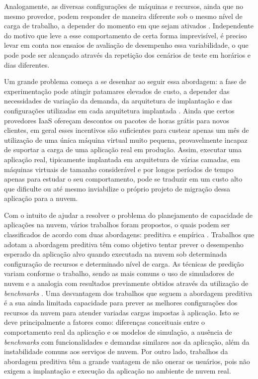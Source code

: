 Analogamente, as diversas configurações de máquinas e recursos, ainda que no mesmo 
provedor, podem responder de maneira diferente sob o mesmo nível de carga de 
trabalho, a depender do momento em que sejam ativados \cite{cunha2011investigating, 
iosup2011performance, jayasinghe2011variations}. Independente do motivo que leve 
a esse comportamento de certa forma imprevisível, é preciso levar em conta nos 
ensaios de avaliação de desempenho essa variabilidade, o que pode pode ser alcançado 
através da repetição dos cenários de teste em horários e dias diferentes.

Um grande problema começa a se desenhar ao seguir essa abordagem: a fase de
experimentação pode atingir patamares elevados de custo, a depender das
necessidades de variação da demanda, da arquitetura de implantação e das 
configurações utilizadas em cada arquitetura implantada \cite{silva2013cloudbench}. 
Ainda que certos provedores IaaS ofereçam descontos ou pacotes de horas grátis 
para novos clientes, em geral esses incentivos são suficientes para custear apenas 
um mês de utilização de uma única máquina virtual muito pequena, provavelmente 
incapaz de suportar a carga de uma aplicação real em produção. Assim, executar 
uma aplicação real, tipicamente implantada em arquitetura de várias camadas, em 
máquinas virtuais de tamanho considerável e por longos períodos de tempo apenas 
para estudar o seu comportamento, pode se traduzir em um custo alto que dificulte ou até mesmo inviabilize 
o próprio projeto de migração dessa aplicação para a nuvem. 

Com o intuito de ajudar a resolver o problema do planejamento de capacidade de aplicações na nuvem, vários trabalhos foram propostos, o quais podem ser classificados de acordo com duas abordagens: preditiva \cite{cloudharmony,
malkowski2010cloudxplor, fittkau2012cdosim, li2011cloudprophet} e empírica 
\cite{jayasinghe2012, silva2013cloudbench, cunhacloud, scheuner2014cloud}.
Trabalhos que adotam a abordagem preditiva têm como objetivo tentar prever o desempenho esperado da aplicação alvo quando executada na nuvem sob determinada configuração de recursos e determinado nível de carga. As técnicas de predição variam conforme o trabalho, sendo as mais comuns o uso de simuladores de nuvem \cite{fittkau2012cdosim} e a analogia com resultados previamente obtidos através da utilização de \emph{benchmarks} \cite{cloudharmony,
malkowski2010cloudxplor}. Uma desvantagem dos trabalhos que seguem a abordagem preditiva é a sua ainda limitada capacidade para prever as melhores configurações dos recursos da nuvem para atender variadas cargas impostas à 
aplicação. Isto se deve principalmente a fatores como: diferenças conceituais entre o comportamento real da aplicação e  
os modelos de simulação, a ausência de \emph{benchmarks} com funcionalidades e demandas similares aos da aplicação, além da instabilidade comuns aos serviços de nuvem. Por outro lado, trabalhos da abordagem preditiva têm a grande vantagem de não onerar os usuários, pois não exigem a implantação e execução da aplicação no ambiente de nuvem real.

